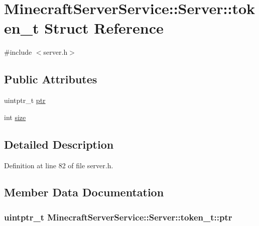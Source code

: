 \hypertarget{struct_minecraft_server_service_1_1_server_1_1token__t}{}\section{Minecraft\+Server\+Service\+:\+:Server\+:\+:token\+\_\+t Struct Reference}
\label{struct_minecraft_server_service_1_1_server_1_1token__t}


{\ttfamily \#include $<$server.\+h$>$}

\subsection*{Public Attributes}
\begin{DoxyCompactItemize}
\item 
uintptr\+\_\+t \hyperlink{struct_minecraft_server_service_1_1_server_1_1token__t_ab1acc91ea95b14ec12f72e08d0f74123}{ptr}
\item 
int \hyperlink{struct_minecraft_server_service_1_1_server_1_1token__t_a04cc8e58e20e2846ccfa1f5d2ff9d47f}{size}
\end{DoxyCompactItemize}


\subsection{Detailed Description}


Definition at line 82 of file server.\+h.



\subsection{Member Data Documentation}
\subsubsection[{\texorpdfstring{ptr}{ptr}}]{\setlength{\rightskip}{0pt plus 5cm}uintptr\+\_\+t Minecraft\+Server\+Service\+::\+Server\+::token\+\_\+t\+::ptr}\hypertarget{struct_minecraft_server_service_1_1_server_1_1token__t_ab1acc91ea95b14ec12f72e08d0f74123}{}\label{struct_minecraft_server_service_1_1_server_1_1token__t_ab1acc91ea95b14ec12f72e08d0f74123}


